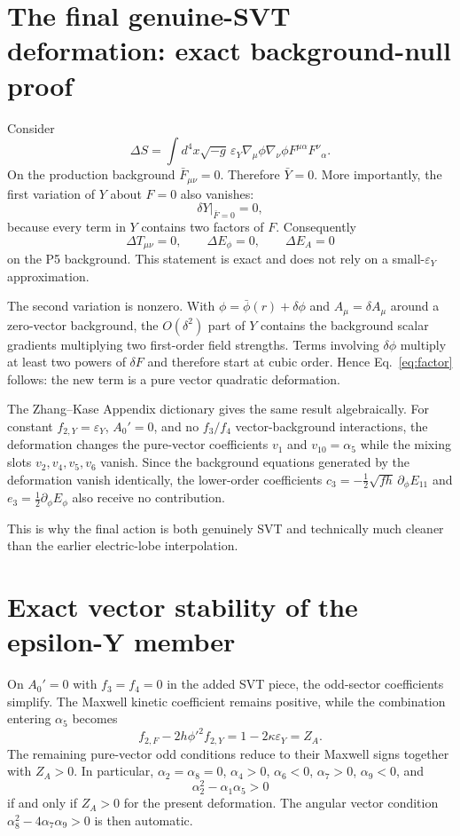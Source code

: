 \documentclass[11pt,a4paper,oneside]{book}
\newcommand{\epsY}{\varepsilon_Y}
\newcommand{\kap}{\kappa}
\begin{document}
\chapter{The final genuine-SVT deformation: exact background-null proof}
Consider
\begin{equation}
 \Delta S=\int d^4x\sqrt{-g}\,\epsY
 \nabla_\mu\phi\nabla_\nu\phi F^{\mu\alpha}F^\nu{}_{\alpha}.
\end{equation}
On the production background $\bar F_{\mu\nu}=0$. Therefore $\bar Y=0$. More importantly, the first variation of $Y$ about $F=0$ also vanishes:
\begin{equation}
 \delta Y\big|_{\bar F=0}=0,
\end{equation}
because every term in $Y$ contains two factors of $F$. Consequently
\begin{equation}
 \Delta T_{\mu\nu}=0,\qquad \Delta E_\phi=0,\qquad \Delta E_A=0
\end{equation}
on the P5 background. This statement is exact and does not rely on a small-$\epsY$ approximation.

The second variation is nonzero. With $\phi=\bar\phi(r)+\delta\phi$ and $A_\mu=\delta A_\mu$ around a zero-vector background, the $O(\delta^2)$ part of $Y$ contains the background scalar gradients multiplying two first-order field strengths. Terms involving $\delta\phi$ multiply at least two powers of $\delta F$ and therefore start at cubic order. Hence Eq.~\eqref{eq:factor} follows: the new term is a pure vector quadratic deformation.

The Zhang--Kase Appendix dictionary gives the same result algebraically. For constant $f_{2,Y}=\epsY$, $A_0'=0$, and no $f_3/f_4$ vector-background interactions, the deformation changes the pure-vector coefficients $v_1$ and $v_{10}=\alpha_5$ while the mixing slots $v_2,v_4,v_5,v_6$ vanish. Since the background equations generated by the deformation vanish identically, the lower-order coefficients $c_3=-\tfrac12\sqrt{fh}\,\partial_\phi E_{11}$ and $e_3=\tfrac12\partial_\phi E_\phi$ also receive no contribution.

This is why the final action is both genuinely SVT and technically much cleaner than the earlier electric-lobe interpolation.

\chapter{Exact vector stability of the epsilon-Y member}
On $A_0'=0$ with $f_3=f_4=0$ in the added SVT piece, the odd-sector coefficients simplify. The Maxwell kinetic coefficient remains positive, while the combination entering $\alpha_5$ becomes
\begin{equation}
 f_{2,F}-2h\phi'^2 f_{2,Y}=1-2\kap\epsY=Z_A.
\end{equation}
The remaining pure-vector odd conditions reduce to their Maxwell signs together with $Z_A>0$. In particular, $\alpha_2=\alpha_8=0$, $\alpha_4>0$, $\alpha_6<0$, $\alpha_7>0$, $\alpha_9<0$, and
\begin{equation}
 \alpha_2^2-\alpha_1\alpha_5>0
\end{equation}
if and only if $Z_A>0$ for the present deformation. The angular vector condition $\alpha_8^2-4\alpha_7\alpha_9>0$ is then automatic.
\end{document}
